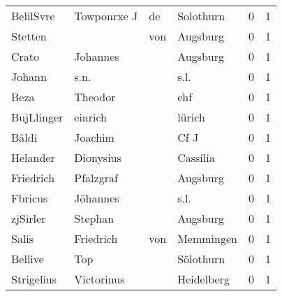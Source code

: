 \begin{tabular}{llllrr}
                BelilSvre &                        Towponrxe J &          de &                                   Solothurn &          0 &         1 \\
                  Stetten &                                    &         von &                                    Augsburg &          0 &         1 \\
                    Crato &                           Johannes &             &                                    Augsburg &          0 &         1 \\
                   Johann &                               s.n. &             &                                        s.l. &          0 &         1 \\
                     Beza &                            Theodor &             &                                         ehf &          0 &         1 \\
               BujLlinger &                            einrich &             &                                      lürich &          0 &         1 \\
                    Bäldi &                            Joachim &             &                                        Cf J &          0 &         1 \\
                 Helander &                          Dionysius &             &                                    Cassilia &          0 &         1 \\
                Friedrich &                          Pfalzgraf &             &                                    Augsburg &          0 &         1 \\
                  Fbricus &                           Jöhannes &             &                                        s.l. &          0 &         1 \\
                 zjSirler &                            Stephan &             &                                    Augsburg &          0 &         1 \\
                    Salis &                          Friedrich &         von &                                   Memmingen &          0 &         1 \\
                  Bellive &                                Top &             &                                   Sölothurn &          0 &         1 \\
               Strigelius &                         Victorinus &             &                                  Heidelberg &          0 &         1 \\

\end{tabular}
